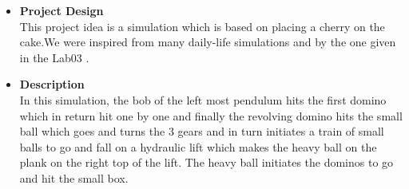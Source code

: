\documentclass{article}
\begin{document}
\begin{itemize}
	\item[] \textbf{\LARGE Project Design} \vspace{0cm} \\
	\large This project idea is a simulation which is based on placing a cherry on the cake.We were inspired from many daily-life simulations and by the one given in the Lab03 .  \vspace{0.2cm}
	\item[] \textbf{\LARGE Description} \vspace{0cm} \\
	\large In this simulation, the bob of the left most pendulum hits the first domino which in return hit one by one and finally the revolving domino hits the small ball which goes and turns the 3 gears and in turn initiates a train of small balls to go and fall on a hydraulic lift  which makes the heavy ball on the plank on the right top of the lift. The heavy ball initiates the dominos to go and hit the small box.\\
 \end{itemize}
\end{document}
